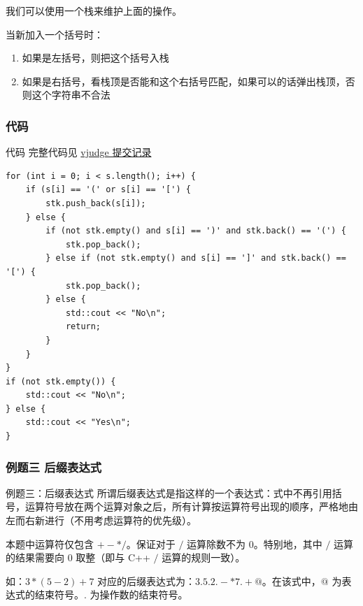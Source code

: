 \documentclass{beamer}
\begin{document}
\begin{frame}
    我们可以使用一个栈来维护上面的操作。

    当新加入一个括号时：

    \begin{enumerate}
        \item 如果是左括号，则把这个括号入栈
        \item 如果是右括号，看栈顶是否能和这个右括号匹配，如果可以的话弹出栈顶，否则这个字符串不合法
    \end{enumerate}
\end{frame}

\subsubsection{代码}
\begin{frame}[fragile]{代码}
    完整代码见 \href{https://vjudge.net/solution/64150195/NWv7brPjI5uhjS91FLfu}{vjudge 提交记录}

    \begin{verbatim}
for (int i = 0; i < s.length(); i++) {
    if (s[i] == '(' or s[i] == '[') {
        stk.push_back(s[i]);
    } else {
        if (not stk.empty() and s[i] == ')' and stk.back() == '(') {
            stk.pop_back();
        } else if (not stk.empty() and s[i] == ']' and stk.back() == '[') {
            stk.pop_back();
        } else {
            std::cout << "No\n";
            return;
        }
    }
}
if (not stk.empty()) {
    std::cout << "No\n";
} else {
    std::cout << "Yes\n";
}
    \end{verbatim}
\end{frame}

\subsubsection{例题三 后缀表达式}
\begin{frame}{例题三：后缀表达式}
    所谓后缀表达式是指这样的一个表达式：式中不再引用括号，运算符号放在两个运算对象之后，所有计算按运算符号出现的顺序，严格地由左而右新进行（不用考虑运算符的优先级）。

    本题中运算符仅包含 $+ - * /$。保证对于 $/$ 运算除数不为 $0$。特别地，其中 $/$ 运算的结果需要向 $0$ 取整（即与 C++ $/$ 运算的规则一致）。

    如：$3*(5-2)+7$ 对应的后缀表达式为：$3.5.2.-*7.+@$。在该式中，$@$ 为表达式的结束符号。$.$ 为操作数的结束符号。
\end{frame}
\end{document}
